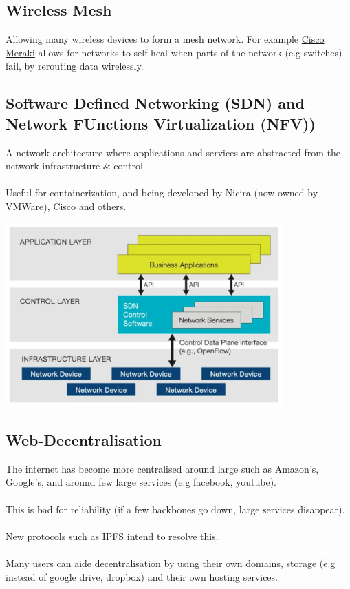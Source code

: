 \subsection{Wireless Mesh}
Allowing many wireless devices to form a mesh network. For example \href{https://meraki.cisco.com/en-uk/}{Cisco Meraki}
allows for networks to self-heal when parts of the network (e.g switches) fail, by rerouting data wirelessly.

\subsection{Software Defined Networking (SDN) and Network FUnctions Virtualization (NFV))}
A network architecture where applications and services are abstracted from the network infrastructure \& control.
\\
\\ Useful for containerization, and being developed by Nicira (now owned by VMWare), Cisco and others.
\begin{center}
    \includegraphics[width=0.8\textwidth]{the_future/images/sdx central SDN}
\end{center}

\subsection{Web-Decentralisation}
The internet has become more centralised around large  such as Amazon's, Google's, and around few large services (e.g facebook, youtube).
\\
\\ This is bad for reliability (if a few backbones go down, large services disappear).
\\
\\ New protocols such as \href{https://ipfs.io/}{IPFS} intend to resolve this.
\\
\\ Many users can aide decentralisation by using their own domains, storage (e.g instead of google drive, dropbox) and their own hosting services.


